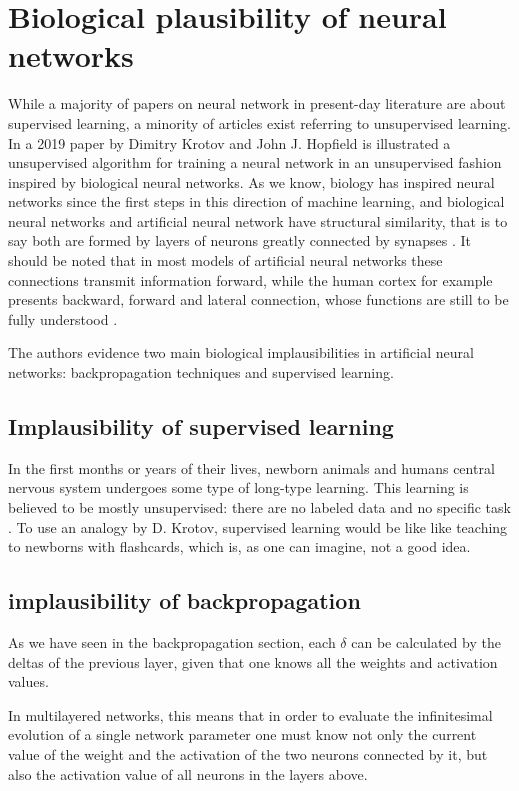 \documentclass[a4paper]{report}
\begin{document}
\section{Biological plausibility of neural networks}
While a majority of papers on neural network in present-day literature are about supervised learning, a minority of articles exist referring to unsupervised learning.
In a 2019 paper by Dimitry Krotov and John J. Hopfield is illustrated a unsupervised algorithm for training a neural network in an unsupervised fashion inspired by biological neural networks.
As we know, biology has inspired neural networks since the first steps in this direction of machine learning, and biological neural networks and artificial neural network have structural similarity, that is to say both are formed by layers of neurons greatly connected by synapses \cite{mcculloch1943logical}.
It should be noted that in most models of artificial neural networks these connections transmit information forward, while the human cortex for example presents backward, forward and lateral connection, whose functions are still to be fully understood \cite{bishop2006pattern}.

The authors evidence two main biological implausibilities in artificial neural networks:
backpropagation techniques and supervised learning.

\subsection{Implausibility of supervised learning}

In the first months or years of their lives, newborn animals and humans central nervous system undergoes some type of long-type learning.
This learning is believed to be mostly unsupervised:
there are no labeled data and no specific task \cite{zou2008overview}.
To use an analogy by D. Krotov, supervised learning would be like like teaching to newborns with flashcards, which is, as one can imagine, not a good idea.

\subsection{implausibility of backpropagation}
As we have seen in the backpropagation section, each $\delta$ can be calculated by the deltas of the previous layer, given that one knows all the weights and activation values.

In multilayered networks, this means that in order to evaluate the infinitesimal evolution of a single network parameter one must know not only the current value of the weight and the activation of the two neurons connected by it, but also the activation value of all neurons in the layers above.
\end{document}
